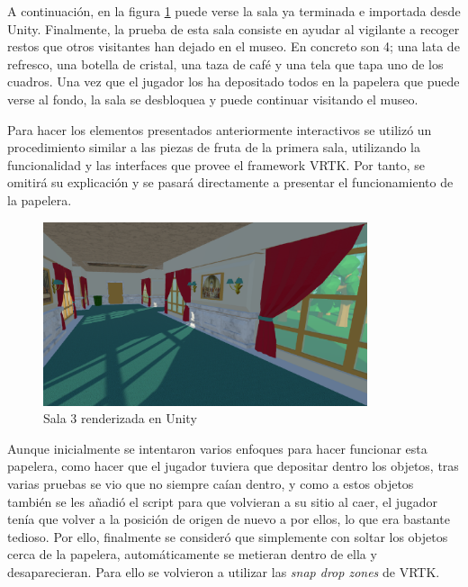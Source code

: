 A continuación, en la figura \ref{fig:unity-sala-3} puede verse la sala ya terminada e importada desde Unity. Finalmente, la prueba de esta sala consiste en ayudar al vigilante a recoger restos que otros visitantes han dejado en el museo. En concreto son 4; una lata de refresco, una botella de cristal, una taza de café y una tela que tapa uno de los cuadros. Una vez que el jugador los ha depositado todos en la papelera que puede verse al fondo, la sala se desbloquea y puede continuar visitando el museo.

Para hacer los elementos presentados anteriormente interactivos se utilizó un procedimiento similar a las piezas de fruta de la primera sala, utilizando la funcionalidad y las interfaces que provee el framework \acs{VRTK}. Por tanto, se omitirá su explicación y se pasará directamente a presentar el funcionamiento de la papelera.

\begin{figure}[!h]
\begin{center}
\includegraphics[width=0.85\textwidth]{imagenes/7/salas-unity/unity-sala-3.png}
\caption{Sala 3 renderizada en Unity}
\label{fig:unity-sala-3}
\end{center}
\end{figure}

Aunque inicialmente se intentaron varios enfoques para hacer funcionar esta papelera, como hacer que el jugador tuviera que depositar dentro los objetos, tras varias pruebas se vio que no siempre caían dentro, y como a estos objetos también se les añadió el script para que volvieran a su sitio al caer, el jugador tenía que volver a la posición de origen de nuevo a por ellos, lo que era bastante tedioso. Por ello, finalmente se consideró que simplemente con soltar los objetos cerca de la papelera, automáticamente se metieran dentro de ella y desaparecieran. Para ello se volvieron a utilizar las \textit{snap drop zones} de \acs{VRTK}. 


